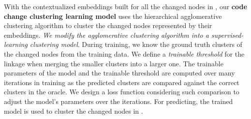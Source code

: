 



With the contextualized embeddings built for all the changed nodes in
{\mvpdg}, our {\bf code change clustering learning model} uses the
hierarchical agglomerative clustering algorithm to cluster the changed
nodes represented by their embeddings.
{\em We modify the agglomerative clustering algorithm into a
  supervised-learning clustering model}. During training, we know the
ground truth clusters of the changed nodes from the training data. We
define a {\em trainable threshold} for the linkage when merging the
smaller clusters into a larger one. The trainable parameters of the
model and the trainable threshold are computed over many iterations in
training as the predicted clusters are compared against the correct
clusters in the oracle. We design a loss function considering such
comparison to adjust the model's parameters over the iterations.
For predicting, the
trained model is used to cluster the changed nodes in {\mvpdg}.


